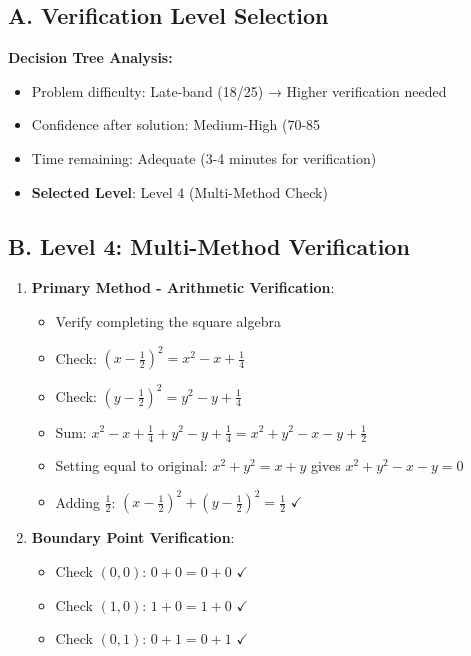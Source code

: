 \documentclass[]{article}
\begin{document}
\begin{verificationbox}
\subsection*{A. Verification Level Selection}

\textbf{Decision Tree Analysis:}
\begin{itemize}[leftmargin=*]
    \item Problem difficulty: Late-band (18/25) → Higher verification needed
    \item Confidence after solution: Medium-High (70-85%
    \item Time remaining: Adequate (3-4 minutes for verification)
    \item \textbf{Selected Level}: Level 4 (Multi-Method Check)
\end{itemize}

\subsection*{B. Level 4: Multi-Method Verification}
\begin{enumerate}[leftmargin=*]
    \item \textbf{Primary Method - Arithmetic Verification}:
    \begin{itemize}
        \item Verify completing the square algebra
        \item Check: $(x-\frac{1}{2})^2 = x^2 - x + \frac{1}{4}$
        \item Check: $(y-\frac{1}{2})^2 = y^2 - y + \frac{1}{4}$
        \item Sum: $x^2 - x + \frac{1}{4} + y^2 - y + \frac{1}{4} = x^2 + y^2 - x - y + \frac{1}{2}$
        \item Setting equal to original: $x^2 + y^2 = x + y$ gives $x^2 + y^2 - x - y = 0$
        \item Adding $\frac{1}{2}$: $(x-\frac{1}{2})^2 + (y-\frac{1}{2})^2 = \frac{1}{2}$ $\checkmark$
    \end{itemize}
    
    \item \textbf{Boundary Point Verification}:
    \begin{itemize}
        \item Check $(0,0)$: $0 + 0 = 0 + 0$ $\checkmark$
        \item Check $(1,0)$: $1 + 0 = 1 + 0$ $\checkmark$
        \item Check $(0,1)$: $0 + 1 = 0 + 1$ $\checkmark$
    \end{itemize}
    

\end{enumerate}
\end{verificationbox}
\end{document}
